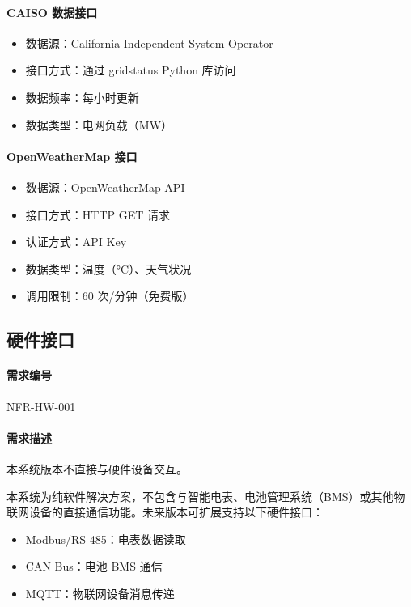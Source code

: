 \paragraph{CAISO 数据接口}
\begin{itemize}
    \item 数据源：California Independent System Operator
    \item 接口方式：通过 gridstatus Python 库访问
    \item 数据频率：每小时更新
    \item 数据类型：电网负载（MW）
\end{itemize}

\paragraph{OpenWeatherMap 接口}
\begin{itemize}
    \item 数据源：OpenWeatherMap API
    \item 接口方式：HTTP GET 请求
    \item 认证方式：API Key
    \item 数据类型：温度（°C）、天气状况
    \item 调用限制：60 次/分钟（免费版）
\end{itemize}

\subsection{硬件接口}

\paragraph{需求编号} NFR-HW-001

\paragraph{需求描述} 本系统版本不直接与硬件设备交互。

本系统为纯软件解决方案，不包含与智能电表、电池管理系统（BMS）或其他物联网设备的直接通信功能。未来版本可扩展支持以下硬件接口：

\begin{itemize}
    \item Modbus/RS-485：电表数据读取
    \item CAN Bus：电池 BMS 通信
    \item MQTT：物联网设备消息传递
\end{itemize}

